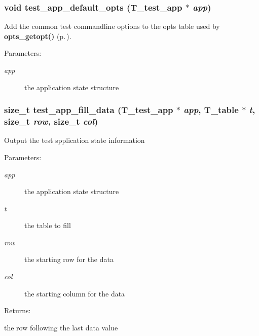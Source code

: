 \subsubsection{\setlength{\rightskip}{0pt plus 5cm}void test\_\-app\_\-default\_\-opts ({\bf T\_\-test\_\-app} $\ast$ {\em app})}\label{test__utils_8h_a36}


Add the common test commandline options to the opts table used by {\bf opts\_\-getopt()} {\rm (p.\,\pageref{group__opts_a3})}.

\begin{Desc}
\item[Parameters: ]\par
\begin{description}
\item[{\em 
app}]the application state structure \end{description}
\end{Desc}
\subsubsection{\setlength{\rightskip}{0pt plus 5cm}size\_\-t test\_\-app\_\-fill\_\-data ({\bf T\_\-test\_\-app} $\ast$ {\em app}, {\bf T\_\-table} $\ast$ {\em t}, size\_\-t {\em row}, size\_\-t {\em col})}\label{test__utils_8h_a39}


Output the test spplication state information \begin{Desc}
\item[Parameters: ]\par
\begin{description}
\item[{\em 
app}]the application state structure \item[{\em 
t}]the table to fill \item[{\em 
row}]the starting row for the data  \item[{\em 
col}]the starting column for the data \end{description}
\end{Desc}
\begin{Desc}
\item[Returns: ]\par
the row following the last data value \end{Desc}
